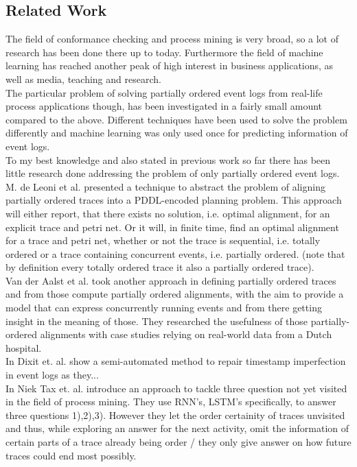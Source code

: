 \documentclass[
	a4paper,
	pagesize,
	pdftex,
	12pt,
	ngerman,
	fleqn,
	final,
	]{scrartcl}
\theoremstyle{plain}
\theoremstyle{definition}
\begin{document}
	\subsection{Related Work}
	The field of conformance checking and process mining is very broad, so a lot of research has been done there up to today. Furthermore the field of machine learning has reached another peak of high interest in business applications, as well as media, teaching and research. \\
	The particular problem of solving partially ordered event logs from real-life process applications though, has been investigated in a fairly small amount compared to the above. 
	Different techniques have been used to solve the problem differently and machine learning was only used once for predicting information of event logs. \\
	To my best knowledge and also stated in previous work \cite{lu2014conformance} so far there has been little research done addressing the problem of only partially ordered event logs.\\
	M. de Leoni et al. presented a technique to abstract the problem of aligning partially ordered traces into a PDDL-encoded planning problem. This approach will either report, that there exists no solution, i.e. optimal alignment, for an explicit trace and petri net. Or it will, in finite time, find an optimal alignment for a trace and petri net, whether or not the trace is sequential, i.e. totally ordered or a trace containing concurrent events, i.e. partially ordered. (note that by definition every totally ordered trace it also a partially ordered trace).\cite{de2018aligning} \\
	Van der Aalst et al. took another approach in defining partially ordered traces and from those compute partially ordered alignments, with the aim to provide a model that can express concurrently running events and from there getting insight in the meaning of those. \cite{lu2014conformanceShort} They researched the usefulness of those partially-ordered alignments with case studies relying on real-world data from a Dutch hospital. \cite{lu2014conformance} \\
	In \cite{dixit2018detection} Dixit et. al. show a semi-automated method to repair timestamp imperfection in event logs as they... \\
	In \cite{tax2017predictive} Niek Tax et. al. introduce an approach to tackle three question not yet visited in the field of process mining. They use RNN's, LSTM's specifically, to answer three questions 1),2),3). However they let the order certainity of traces unvisited and thus, while exploring an answer for the next activity, omit the information of certain parts of a trace already being order / they only give answer on how future traces could end most possibly. \\
\end{document}
